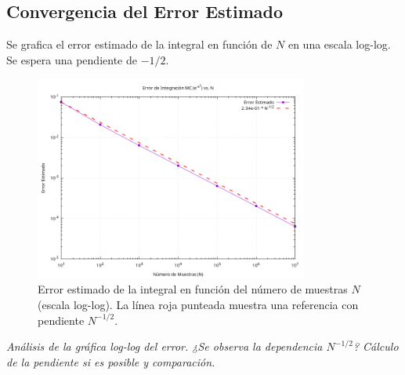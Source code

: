 \documentclass[11pt,a4paper]{article}
\begin{document}
\subsection{Convergencia del Error Estimado}
Se grafica el error estimado de la integral en función de $N$ en una escala log-log. Se espera una pendiente de $-1/2$.
\begin{figure}[h!]
    \centering
    \includegraphics[width=0.8\textwidth]{../results/integral_mc_exp_neg_x2_error_vs_N.png} %
    \caption{Error estimado de la integral en función del número de muestras $N$ (escala log-log). La línea roja punteada muestra una referencia con pendiente $N^{-1/2}$.}
    \label{fig:integral_error}
\end{figure}
\textit{Análisis de la gráfica log-log del error. ¿Se observa la dependencia $N^{-1/2}$? Cálculo de la pendiente si es posible y comparación.}
\end{document}
